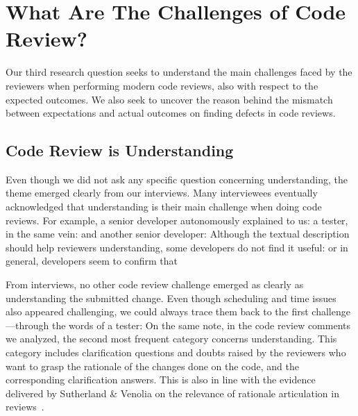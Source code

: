 
\section{What Are The Challenges of Code Review?} \label{sec:challenges}


Our third research question seeks to understand the main challenges faced by the reviewers when performing modern code reviews, also with respect to the expected outcomes. We also seek to uncover the reason behind the mismatch between expectations and actual outcomes on finding defects in code reviews.


\subsection{Code Review is Understanding}

Even though we did not ask any specific question concerning understanding, the theme emerged clearly from our interviews. Many interviewees eventually acknowledged that understanding is their main challenge when doing code reviews. For example, a senior developer autonomously explained to us:  a tester, in the same vein:  and another senior developer:  Although the textual description should help reviewers understanding, some developers do not find it useful:  or  in general, developers seem to confirm that 

From interviews, no other code review challenge emerged as clearly as understanding the submitted change. Even though scheduling and time issues also appeared challenging, we could always trace them back to the first challenge—through the words of a tester:  On the same note, in the code review comments we analyzed, the second most frequent category concerns understanding. This category includes clarification questions and doubts raised by the reviewers who want to grasp the rationale of the changes done on the code, and the corresponding clarification answers. This is also in line with the evidence delivered by Sutherland \& Venolia on the relevance of rationale articulation in reviews~\cite{sutherland2009can}.

